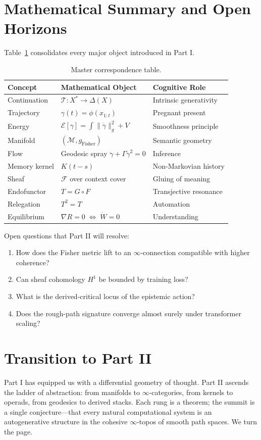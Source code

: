 \documentclass[12pt,a4paper,twoside,openright]{book}
\begin{document}
\section{Mathematical Summary and Open Horizons}
\label{sec:summary}
Table~\ref{tab:master} consolidates every major object introduced in Part I.
\begin{table}[ht]
\centering
\small
\begin{tabular}{lll}
\toprule
Concept & Mathematical Object & Cognitive Role \\
\midrule
Continuation & $\mathcal{T}:X^*\to\Delta(X)$ & Intrinsic generativity \\
Trajectory & $\gamma(t)=\phi(x_{1:t})$ & Pregnant present \\
Energy & $\mathcal{E}[\gamma]=\int\|\dot\gamma\|_g^2+V$ & Smoothness principle \\
Manifold & $(\mathcal{M},g_{\text{Fisher}})$ & Semantic geometry \\
Flow & Geodesic spray $\ddot\gamma+\Gamma\dot\gamma^2=0$ & Inference \\
Memory kernel & $K(t-s)$ & Non-Markovian history \\
Sheaf & $\mathcal{F}$ over context cover & Gluing of meaning \\
Endofunctor & $T=G\circ F$ & Transjective resonance \\
Relegation & $T^2=T$ & Automation \\
Equilibrium & $\nabla R=0\;\Leftrightarrow\;\dot W=0$ & Understanding \\
\bottomrule
\end{tabular}
\caption{Master correspondence table.}
\label{tab:master}
\end{table}
Open questions that Part II will resolve:
\begin{enumerate}
\item How does the Fisher metric lift to an $\infty$-connection compatible with higher coherence?
\item Can sheaf cohomology $H^1$ be bounded by training loss?
\item What is the derived-critical locus of the epistemic action?
\item Does the rough-path signature converge almost surely under transformer scaling?
\end{enumerate}

\section*{Transition to Part II}
Part I has equipped us with a differential geometry of thought.
Part II ascends the ladder of abstraction: from manifolds to $\infty$-categories, from kernels to operads, from geodesics to derived stacks.
Each rung is a theorem; the summit is a single conjecture—that every natural computational system is an autogenerative structure in the cohesive $\infty$-topos of smooth path spaces.
We turn the page.
\end{document}
